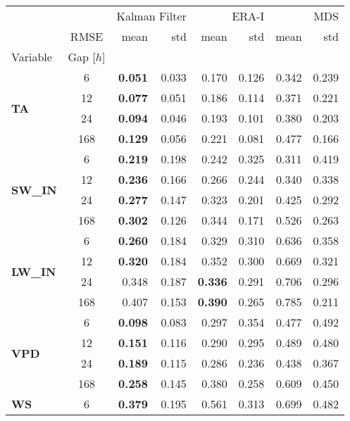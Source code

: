 \begin{table}
\centering
\caption{\CapTheTableStand}
\label{tbl:the_table_stand}
\begin{tabular}{p{2.1cm}c|rr|rr|rr}
\toprule
 &  & \multicolumn{2}{r}{Kalman Filter} & \multicolumn{2}{r}{ERA-I} & \multicolumn{2}{r}{MDS} \\
 & RMSE & mean & std & mean & std & mean & std \\
Variable & Gap [$h$] &  &  &  &  &  &  \\
\midrule
\multirow[c]{4}{*}{\parbox{2.1cm}{\textbf{TA}}} & 6 & \bfseries 0.051 & 0.033 & 0.170 & 0.126 & 0.342 & 0.239 \\
 & 12 & \bfseries 0.077 & 0.051 & 0.186 & 0.114 & 0.371 & 0.221 \\
 & 24 & \bfseries 0.094 & 0.046 & 0.193 & 0.101 & 0.380 & 0.203 \\
 & 168 & \bfseries 0.129 & 0.056 & 0.221 & 0.081 & 0.477 & 0.166 \\
\cline{1-8}
\multirow[c]{4}{*}{\parbox{2.1cm}{\textbf{SW\_IN}}} & 6 & \bfseries 0.219 & 0.198 & 0.242 & 0.325 & 0.311 & 0.419 \\
 & 12 & \bfseries 0.236 & 0.166 & 0.266 & 0.244 & 0.340 & 0.338 \\
 & 24 & \bfseries 0.277 & 0.147 & 0.323 & 0.201 & 0.425 & 0.292 \\
 & 168 & \bfseries 0.302 & 0.126 & 0.344 & 0.171 & 0.526 & 0.263 \\
\cline{1-8}
\multirow[c]{4}{*}{\parbox{2.1cm}{\textbf{LW\_IN}}} & 6 & \bfseries 0.260 & 0.184 & 0.329 & 0.310 & 0.636 & 0.358 \\
 & 12 & \bfseries 0.320 & 0.184 & 0.352 & 0.300 & 0.669 & 0.321 \\
 & 24 & 0.348 & 0.187 & \bfseries 0.336 & 0.291 & 0.706 & 0.296 \\
 & 168 & 0.407 & 0.153 & \bfseries 0.390 & 0.265 & 0.785 & 0.211 \\
\cline{1-8}
\multirow[c]{4}{*}{\parbox{2.1cm}{\textbf{VPD}}} & 6 & \bfseries 0.098 & 0.083 & 0.297 & 0.354 & 0.477 & 0.492 \\
 & 12 & \bfseries 0.151 & 0.116 & 0.290 & 0.295 & 0.489 & 0.480 \\
 & 24 & \bfseries 0.189 & 0.115 & 0.286 & 0.236 & 0.438 & 0.367 \\
 & 168 & \bfseries 0.258 & 0.145 & 0.380 & 0.258 & 0.609 & 0.450 \\
\cline{1-8}
\multirow[c]{4}{*}{\parbox{2.1cm}{\textbf{WS}}} & 6 & \bfseries 0.379 & 0.195 & 0.561 & 0.313 & 0.699 & 0.482 \\

\end{tabular}
\end{table}
